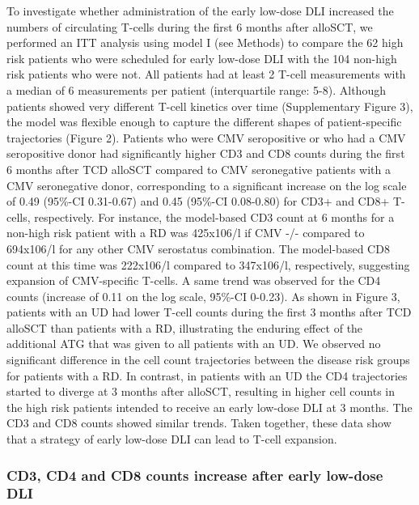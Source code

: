 \documentclass[
  letterpaper,
  DIV=11,
  numbers=noendperiod]{scrreprt}
\begin{document}
To investigate whether administration of the early low-dose DLI
increased the numbers of circulating T-cells during the first 6 months
after alloSCT, we performed an ITT analysis using model I (see Methods)
to compare the 62 high risk patients who were scheduled for early
low-dose DLI with the 104 non-high risk patients who were not. All
patients had at least 2 T-cell measurements with a median of 6
measurements per patient (interquartile range: 5-8). Although patients
showed very different T-cell kinetics over time (Supplementary Figure
3), the model was flexible enough to capture the different shapes of
patient-specific trajectories (Figure 2). Patients who were CMV
seropositive or who had a CMV seropositive donor had significantly
higher CD3 and CD8 counts during the first 6 months after TCD alloSCT
compared to CMV seronegative patients with a CMV seronegative donor,
corresponding to a significant increase on the log scale of 0.49
(95\%-CI 0.31-0.67) and 0.45 (95\%-CI 0.08-0.80) for CD3+ and CD8+
T-cells, respectively. For instance, the model-based CD3 count at 6
months for a non-high risk patient with a RD was 425x106/l if CMV -/-
compared to 694x106/l for any other CMV serostatus combination. The
model-based CD8 count at this time was 222x106/l compared to 347x106/l,
respectively, suggesting expansion of CMV-specific T-cells. A same trend
was observed for the CD4 counts (increase of 0.11 on the log scale,
95\%-CI 0-0.23). As shown in Figure 3, patients with an UD had lower
T-cell counts during the first 3 months after TCD alloSCT than patients
with a RD, illustrating the enduring effect of the additional ATG that
was given to all patients with an UD. We observed no significant
difference in the cell count trajectories between the disease risk
groups for patients with a RD. In contrast, in patients with an UD the
CD4 trajectories started to diverge at 3 months after alloSCT, resulting
in higher cell counts in the high risk patients intended to receive an
early low-dose DLI at 3 months. The CD3 and CD8 counts showed similar
trends. Taken together, these data show that a strategy of early
low-dose DLI can lead to T-cell expansion.

\hypertarget{cd3-cd4-and-cd8-counts-increase-after-early-low-dose-dli}{%
\subsubsection{CD3, CD4 and CD8 counts increase after early low-dose
DLI}\label{cd3-cd4-and-cd8-counts-increase-after-early-low-dose-dli}}
\end{document}
